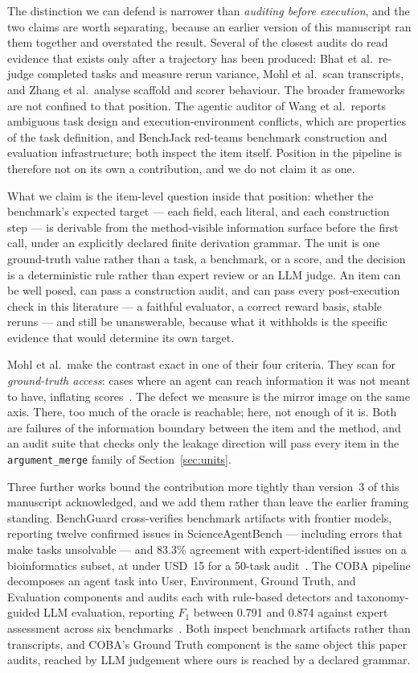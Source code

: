 \documentclass[11pt]{article}
\newcommand{\dfam}[1]{\texttt{#1}}
\begin{document}
The distinction we can defend is narrower than \emph{auditing before
execution}, and the two claims are worth separating, because an earlier version
of this manuscript ran them together and overstated the result. Several of the
closest audits do read evidence that exists only after a trajectory has been
produced: Bhat et al.\ re-judge completed tasks and measure rerun variance,
Mohl et al.\ scan transcripts, and Zhang et al.\ analyse scaffold and scorer
behaviour. The broader frameworks are not confined to that position. The
agentic auditor of Wang et al.\ reports ambiguous task design and
execution-environment conflicts, which are properties of the task definition,
and BenchJack red-teams benchmark construction and evaluation infrastructure;
both inspect the item itself. Position in the pipeline is therefore not on its
own a contribution, and we do not claim it as one.

What we claim is the item-level question inside that position: whether the
benchmark's expected target --- each field, each literal, and each construction
step --- is derivable from the method-visible information surface before the
first call, under an explicitly declared finite derivation grammar. The unit is
one ground-truth value rather than a task, a benchmark, or a score, and the
decision is a deterministic rule rather than expert review or an LLM judge. An
item can be well posed, can pass a construction audit, and can pass every
post-execution check in this literature --- a faithful evaluator, a correct
reward basis, stable reruns --- and still be unanswerable, because what it
withholds is the specific evidence that would determine its own target.

Mohl et al.\ make the contrast exact in one of their four criteria. They scan
for \emph{ground-truth access}: cases where an agent can reach information it
was not meant to have, inflating scores~\cite{mohl2026transcript}. The defect
we measure is the mirror image on the same axis. There, too much of the oracle
is reachable; here, not enough of it is. Both are failures of the information
boundary between the item and the method, and an audit suite that checks only
the leakage direction will pass every item in the \dfam{argument\_merge}
family of Section~\ref{sec:units}.

Three further works bound the contribution more tightly than version~3 of this
manuscript acknowledged, and we add them rather than leave the earlier framing
standing. BenchGuard cross-verifies benchmark artifacts with frontier models,
reporting twelve confirmed issues in ScienceAgentBench --- including errors
that make tasks unsolvable --- and 83.3\% agreement with expert-identified
issues on a bioinformatics subset, at under USD~15 for a 50-task
audit~\cite{tu2026benchguard}. The COBA pipeline decomposes an agent task into
User, Environment, Ground Truth, and Evaluation components and audits each with
rule-based detectors and taxonomy-guided LLM evaluation, reporting $F_1$
between 0.791 and 0.874 against expert assessment across six
benchmarks~\cite{suh2026agentsuite}. Both inspect benchmark artifacts rather
than transcripts, and COBA's Ground Truth component is the same object this
paper audits, reached by LLM judgement where ours is reached by a declared
grammar.
\end{document}
